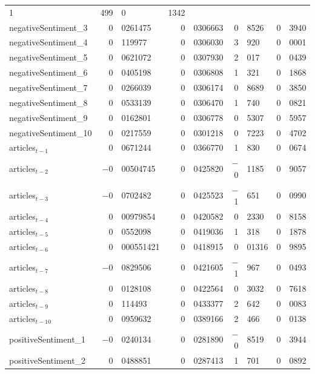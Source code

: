 \begin{center}
\begin{longtable}{lr@{.}lr@{.}lr@{.}lr@{.}l}
        1&499 &
        0&1342 \\
negativeSentiment\_3 &
    0&0261475 &
    0&0306663 &
        0&8526 &
        0&3940 \\
negativeSentiment\_4 &
    0&119977 &
    0&0306030 &
        3&920 &
        0&0001 \\
negativeSentiment\_5 &
    0&0621072 &
    0&0307930 &
        2&017 &
        0&0439 \\
negativeSentiment\_6 &
    0&0405198 &
    0&0306808 &
        1&321 &
        0&1868 \\
negativeSentiment\_7 &
    0&0266039 &
    0&0306174 &
        0&8689 &
        0&3850 \\
negativeSentiment\_8 &
    0&0533139 &
    0&0306470 &
        1&740 &
        0&0821 \\
negativeSentiment\_9 &
    0&0162801 &
    0&0306778 &
        0&5307 &
        0&5957 \\
negativeSentiment\_10 &
    0&0217559 &
    0&0301218 &
        0&7223 &
        0&4702 \\
articles$_{t-1}$ &
    0&0671244 &
    0&0366770 &
        1&830 &
        0&0674 \\
articles$_{t-2}$ &
    $-$0&00504745 &
    0&0425820 &
        $-$0&1185 &
        0&9057 \\
articles$_{t-3}$ &
    $-$0&0702482 &
    0&0425523 &
        $-$1&651 &
        0&0990 \\
articles$_{t-4}$ &
    0&00979854 &
    0&0420582 &
        0&2330 &
        0&8158 \\
articles$_{t-5}$ &
    0&0552098 &
    0&0419036 &
        1&318 &
        0&1878 \\
articles$_{t-6}$ &
    0&000551421 &
    0&0418915 &
        0&01316 &
        0&9895 \\
articles$_{t-7}$ &
    $-$0&0829506 &
    0&0421605 &
        $-$1&967 &
        0&0493 \\
articles$_{t-8}$ &
    0&0128108 &
    0&0422564 &
        0&3032 &
        0&7618 \\
articles$_{t-9}$ &
    0&114493 &
    0&0433377 &
        2&642 &
        0&0083 \\
articles$_{t-10}$ &
    0&0959632 &
    0&0389166 &
        2&466 &
        0&0138 \\
positiveSentiment\_1 &
    $-$0&0240134 &
    0&0281890 &
        $-$0&8519 &
        0&3944 \\
positiveSentiment\_2 &
    0&0488851 &
    0&0287413 &
        1&701 &
        0&0892 \\

\end{longtable}
\end{center}
